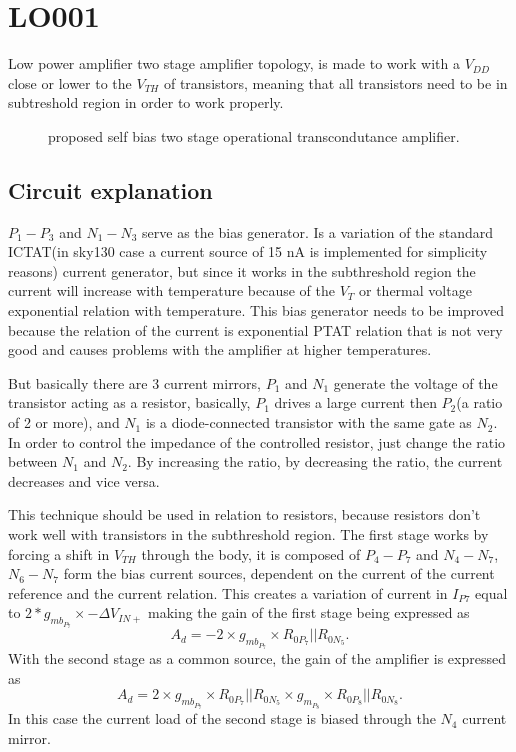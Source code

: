 \documentclass[12pt]{article}
\begin{document}
\section{LO001}
Low power amplifier two stage amplifier topology, is made to work with a $V_{DD}$ close or lower to the $V_{TH}$ of transistors, meaning that all transistors need to be in subtreshold region in order to work properly.
\begin{figure}[H]
        \centering
        
        \caption{proposed self bias two stage operational transcondutance amplifier.}
        \label{LOP001}
\end{figure}
\subsection{Circuit explanation}


$P_1-P_3$ and $N_1-N_3$ serve as the bias generator. Is a variation of the standard ICTAT(in sky130 case a current source of 15 nA is implemented for simplicity reasons) current generator, but since it works in the subthreshold region the current will increase with temperature because of the $V_T$ or thermal voltage exponential relation with temperature. This bias generator needs to be improved because the relation of the current is exponential PTAT relation that is not very good and causes problems with the amplifier at higher temperatures.

But basically there are 3 current mirrors, $P_1$ and $N_1$ generate the voltage of the transistor acting as a resistor, basically, $P_1$ drives a large current then $P_2$(a ratio of 2 or more), and $N_1$ is a diode-connected transistor with the same gate as $N_2$. In order to control the impedance of the controlled resistor, just change the ratio between $N_1$ and $N_2$. By increasing the ratio, by decreasing the ratio, the current decreases and vice versa.

This technique should be used in relation to resistors, because resistors don't work well with transistors in the subthreshold region. 
The first stage works by forcing a shift in $V_{TH}$ through the body, it is composed of  $P_4-P_7$ and $N_4-N_7$, $N_6-N_7$ form the bias current sources, dependent on the current of the current reference and the current relation.
This creates a variation of current in  $I_{P7}$ equal to $2*g_{mb_{P_{7}}} \times -\Delta V_{IN+}$ making the gain of the first stage being expressed as 
\begin{equation}
    A_d= -2\times g_{mb_{P_{7}}} \times R_{0P_7}|| R_{0N_5}.
\end{equation}
With the second stage as a common source, the gain of the amplifier is expressed as
\begin{equation}
    A_d= 2 \times g_{mb_{P_{7}}} \times R_{0P_7}|| R_{0N_5} \times  g_{m_{P_8}} \times R_{0P_8}|| R_{0N_8}.
\end{equation}
In this case the current load of the second stage is biased through the $N_4$ current mirror.
\end{document}
